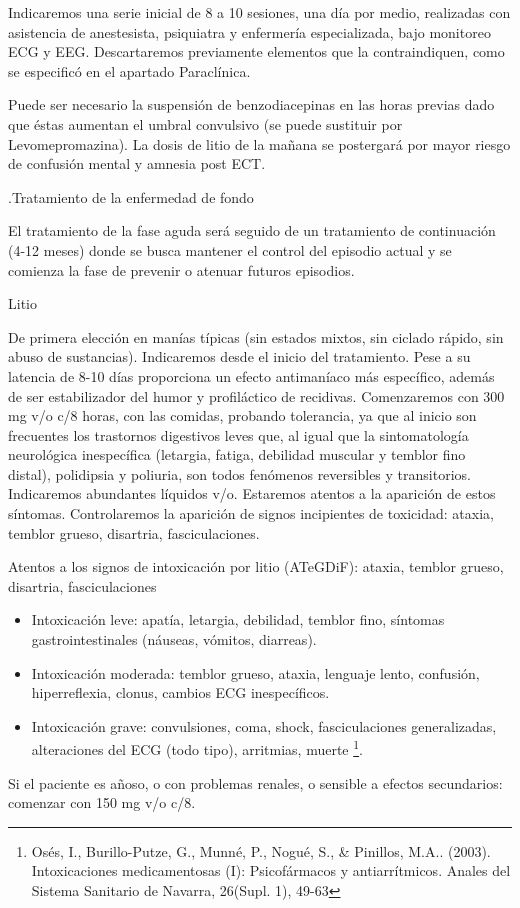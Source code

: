 \documentclass{scrbook}
\begin{document}
Indicaremos una serie inicial de 8 a 10 sesiones, una día por medio, realizadas con asistencia de anestesista, psiquiatra y enfermería especializada, bajo monitoreo ECG y EEG. Descartaremos previamente elementos que la contraindiquen, como se especificó en el apartado Paraclínica.

Puede ser necesario la suspensión de benzodiacepinas en las horas previas dado que éstas aumentan el umbral convulsivo (se puede sustituir por Levomepromazina). La dosis de litio de la mañana se postergará por mayor riesgo de confusión mental y amnesia post ECT.

.Tratamiento de la enfermedad de fondo

El tratamiento de la fase aguda será seguido de un tratamiento de continuación (4-12 meses) donde se busca mantener el control del episodio actual y se comienza la fase de prevenir o atenuar futuros episodios.

\faPills Litio

De primera elección en manías típicas (sin estados mixtos, sin ciclado rápido, sin abuso de sustancias). Indicaremos desde el inicio del tratamiento. Pese a su latencia de 8-10 días proporciona un efecto antimaníaco más específico, además de ser estabilizador del humor y profiláctico de recidivas. Comenzaremos con 300 mg v/o c/8 horas, con las comidas, probando tolerancia, ya que al inicio son frecuentes los trastornos digestivos leves que, al igual que la sintomatología neurológica inespecífica (letargia, fatiga, debilidad muscular y temblor fino distal), polidipsia y poliuria, son todos fenómenos reversibles y transitorios. Indicaremos abundantes líquidos v/o. Estaremos atentos a la aparición de estos síntomas. Controlaremos la aparición de signos incipientes de toxicidad: ataxia, temblor grueso, disartria, fasciculaciones.

\faRadiation Atentos a los signos de intoxicación por litio (ATeGDiF): ataxia, temblor grueso, disartria, fasciculaciones
\begin{itemize}
	\item Intoxicación leve: apatía, letargia, debilidad, temblor fino, síntomas gastrointestinales (náuseas, vómitos, diarreas).
	\item Intoxicación moderada: temblor grueso, ataxia, lenguaje lento, confusión, hiperreflexia, clonus, cambios ECG inespecíficos.
	\item Intoxicación grave: convulsiones, coma, shock, fasciculaciones generalizadas, alteraciones del ECG (todo tipo), arritmias, muerte \footnote{Osés, I., Burillo-Putze, G., Munné, P., Nogué, S., \& Pinillos, M.A.. (2003). Intoxicaciones medicamentosas (I): Psicofármacos y antiarrítmicos. Anales del Sistema Sanitario de Navarra, 26(Supl. 1), 49-63}.
\end{itemize}
Si el paciente es añoso, o con problemas renales, o sensible a efectos secundarios: comenzar con 150 mg v/o c/8.
\end{document}

